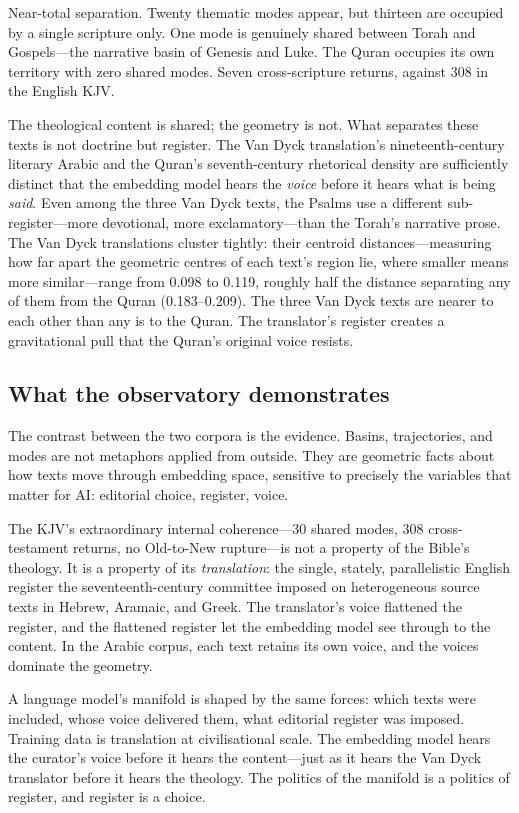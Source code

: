 Near-total separation. Twenty thematic modes appear, but thirteen are occupied by a single scripture only. One mode is genuinely shared between Torah and Gospels---the narrative basin of Genesis and Luke. The Quran occupies its own territory with zero shared modes. Seven cross-scripture returns, against 308 in the English KJV.

The theological content is shared; the geometry is not. What separates these texts is not doctrine but register. The Van Dyck translation's nineteenth-century literary Arabic and the Quran's seventh-century rhetorical density are sufficiently distinct that the embedding model hears the \textit{voice} before it hears what is being \textit{said}. Even among the three Van Dyck texts, the Psalms use a different sub-register---more devotional, more exclamatory---than the Torah's narrative prose. The Van Dyck translations cluster tightly: their centroid distances---measuring how far apart the geometric centres of each text's region lie, where smaller means more similar---range from 0.098 to 0.119, roughly half the distance separating any of them from the Quran (0.183--0.209). The three Van Dyck texts are nearer to each other than any is to the Quran. The translator's register creates a gravitational pull that the Quran's original voice resists.

\subsection{What the observatory demonstrates}

The contrast between the two corpora is the evidence. Basins, trajectories, and modes are not metaphors applied from outside. They are geometric facts about how texts move through embedding space, sensitive to precisely the variables that matter for AI: editorial choice, register, voice.

The KJV's extraordinary internal coherence---30 shared modes, 308 cross-testament returns, no Old-to-New rupture---is not a property of the Bible's theology. It is a property of its \emph{translation}: the single, stately, parallelistic English register the seventeenth-century committee imposed on heterogeneous source texts in Hebrew, Aramaic, and Greek. The translator's voice flattened the register, and the flattened register let the embedding model see through to the content. In the Arabic corpus, each text retains its own voice, and the voices dominate the geometry.

A language model's manifold is shaped by the same forces: which texts were included, whose voice delivered them, what editorial register was imposed. Training data is translation at civilisational scale. The embedding model hears the curator's voice before it hears the content---just as it hears the Van Dyck translator before it hears the theology. The politics of the manifold is a politics of register, and register is a choice.


